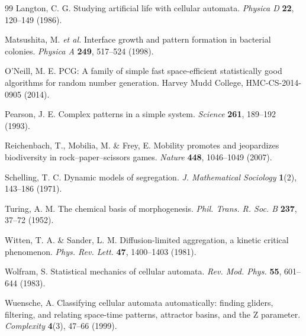 \documentclass[11pt,a4paper]{article}
\begin{document}
\begin{thebibliography}{99}
 Langton, C. G.
  Studying artificial life with cellular automata.
  \emph{Physica D} \textbf{22}, 120--149 (1986).

 Matsushita, M. \emph{et al.}
  Interface growth and pattern formation in bacterial colonies.
  \emph{Physica A} \textbf{249}, 517--524 (1998).

 O'Neill, M. E.
  PCG: A family of simple fast space-efficient statistically good algorithms for
  random number generation. Harvey Mudd College, HMC-CS-2014-0905 (2014).

 Pearson, J. E.
  Complex patterns in a simple system.
  \emph{Science} \textbf{261}, 189--192 (1993).

 Reichenbach, T., Mobilia, M. \& Frey, E.
  Mobility promotes and jeopardizes biodiversity in rock--paper--scissors games.
  \emph{Nature} \textbf{448}, 1046--1049 (2007).

 Schelling, T. C.
  Dynamic models of segregation.
  \emph{J. Mathematical Sociology} \textbf{1}(2), 143--186 (1971).

 Turing, A. M.
  The chemical basis of morphogenesis.
  \emph{Phil. Trans. R. Soc. B} \textbf{237}, 37--72 (1952).

 Witten, T. A. \& Sander, L. M.
  Diffusion-limited aggregation, a kinetic critical phenomenon.
  \emph{Phys. Rev. Lett.} \textbf{47}, 1400--1403 (1981).

 Wolfram, S.
  Statistical mechanics of cellular automata.
  \emph{Rev. Mod. Phys.} \textbf{55}, 601--644 (1983).

 Wuensche, A.
  Classifying cellular automata automatically: finding gliders, filtering, and
  relating space-time patterns, attractor basins, and the Z parameter.
  \emph{Complexity} \textbf{4}(3), 47--66 (1999).

\end{thebibliography}
\end{document}
